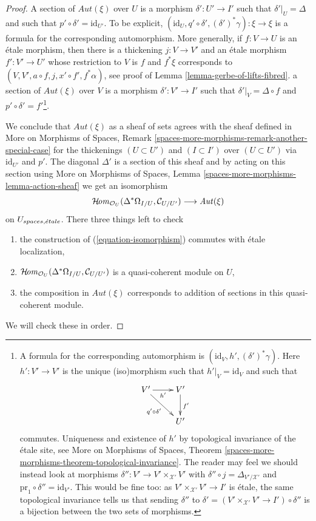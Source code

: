 \begin{proof}
\medskip\noindent
A section of $\mathit{Aut}(\xi)$ over $U$ is a morphism $\delta' : U' \to I'$
such that $\delta'|_U = \Delta$ and such that
$p' \circ \delta' = \text{id}_{U'}$. To be explicit,
$(\text{id}_U, q' \circ \delta', (\delta')^*\gamma) : \xi \to \xi$
is a formula for the corresponding automorphism.
More generally, if
$f : V \to U$ is an \'etale morphism, then there is a thickening
$j : V \to V'$ and an \'etale morphism
$f' : V' \to U'$ whose restriction to $V$ is $f$ and $f^*\xi$
corresponds to $(V, V', a \circ f, j, x' \circ f', f^*\alpha)$, see proof of
Lemma \ref{lemma-gerbe-of-lifts-fibred}.
 a section of $\mathit{Aut}(\xi)$ over $V$ is a morphism
$\delta' : V' \to I'$
such that $\delta'|_V = \Delta \circ f$
and $p' \circ \delta' = f'$\footnote{A formula for the corresponding
automorphism is $(\text{id}_V, h', (\delta')^*\gamma)$.
Here $h' : V' \to V'$ is the unique (iso)morphism such that
$h'|_V = \text{id}_V$ and such that
$$
\xymatrix{
V' \ar[r]_{h'} \ar[rd]_{q' \circ \delta'} & V' \ar[d]^{f'} \\
& U'
}
$$
commutes. Uniqueness and existence of $h'$ by topological invariance of
the \'etale site, see More on Morphisms of Spaces,
Theorem \ref{spaces-more-morphisms-theorem-topological-invariance}.
The reader may feel we should instead look at morphisms
$\delta'' : V' \to V' \times_{\mathcal{X}'} V'$ with
$\delta'' \circ j = \Delta_{V'/\mathcal{X}'}$ and
$\text{pr}_1 \circ \delta'' = \text{id}_{V'}$.
This would be fine too: as $V' \times_{\mathcal{X}'} V' \to I'$ is \'etale,
the same topological invariance tells us that sending
$\delta''$ to $\delta' = (V' \times_{\mathcal{X}'} V' \to I') \circ \delta''$
is a bijection between the two
sets of morphisms.}.

\medskip\noindent
We conclude that $\mathit{Aut}(\xi)$ as a sheaf of sets agrees with
the sheaf defined in
More on Morphisms of Spaces, Remark
\ref{spaces-more-morphisms-remark-another-special-case}
for the thickenings $(U \subset U')$ and $(I \subset I')$ over
$(U \subset U')$ via $\text{id}_{U'}$ and $p'$.
The diagonal $\Delta'$ is a section of this sheaf and by
acting on this section using More on Morphisms of Spaces, Lemma
\ref{spaces-more-morphisms-lemma-action-sheaf}
we get an isomorphism
\begin{equation}
\label{equation-isomorphism}
\mathop{\mathcal{H}\!\mathit{om}}\nolimits_{\mathcal{O}_U}(\Delta^*\Omega_{I/U}, \mathcal{C}_{U/U'})
\longrightarrow
\mathit{Aut}(\xi)
\end{equation}
on $U_{spaces, {\acute{e}tale}}$. There three things left to check
\begin{enumerate}
\item the construction of (\ref{equation-isomorphism})
commutes with \'etale localization,
\item $\mathop{\mathcal{H}\!\mathit{om}}\nolimits_{\mathcal{O}_U}(\Delta^*\Omega_{I/U}, \mathcal{C}_{U/U'})$
is a quasi-coherent module on $U$,
\item the composition in $\mathit{Aut}(\xi)$ corresponds
to addition of sections in this quasi-coherent module.
\end{enumerate}
We will check these in order.


\end{proof}
